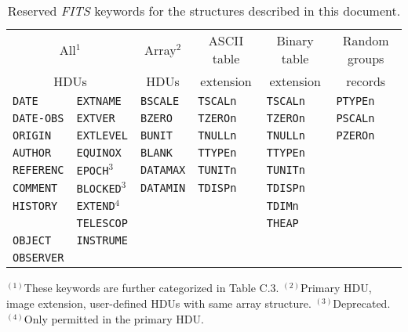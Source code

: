 \documentclass[onecolumn]{aa}
\begin{document}

\begin{table}[hbp]   
\begin{center}
\caption[Reserved {\em FITS\/} keywords.]
         {Reserved {\em FITS\/} keywords for the 
          structures described in this document.}
\label{ta:reservedkeys}
\begin{tabular}{llllll} 
\hline \hline
\multicolumn{2}{c}{All$^{1}$}       & \multicolumn{1}{c}{Array$^{2}$} & 
\multicolumn{1}{c}{ASCII table} & 
\multicolumn{1}{c}{Binary table}& \multicolumn{1}{c}{Random groups}
\\ 
\multicolumn{2}{c}{HDUs}      &\multicolumn{1}{c}{HDUs}        & 
\multicolumn{1}{c}{extension}   & 
\multicolumn{1}{c}{extension}    & \multicolumn{1}{c}{records}     \\
\hline
{\tt DATE}     & {\tt EXTNAME}       & {\tt BSCALE}  & {\tt TSCALn}  & {\tt TSCALn}   & {\tt PTYPEn}  \\ 
{\tt DATE-OBS} & {\tt EXTVER}       & {\tt BZERO}   & {\tt TZEROn}  & {\tt TZEROn}   & {\tt PSCALn}  \\
{\tt ORIGIN}   & {\tt EXTLEVEL}      & {\tt BUNIT}   & {\tt TNULLn}  & {\tt TNULLn}   & {\tt PZEROn}  \\
{\tt AUTHOR}   & {\tt EQUINOX}       & {\tt BLANK}   & {\tt TTYPEn}  & {\tt TTYPEn}   &               \\
{\tt REFERENC} & {\tt EPOCH}$^{3}$   & {\tt DATAMAX} & {\tt TUNITn}  & {\tt TUNITn}   &               \\
{\tt COMMENT}  & {\tt BLOCKED}$^{3}$ & {\tt DATAMIN} & {\tt TDISPn}  & {\tt TDISPn}   &               \\ 
{\tt HISTORY}  & {\tt EXTEND}$^{4}$  &               &               & {\tt TDIMn}    &               \\    
\verb*+        + &  {\tt TELESCOP}   &               &               & {\tt THEAP}    &               \\       
{\tt OBJECT}   & {\tt INSTRUME}      &               &               &                &               \\  
{\tt OBSERVER} &                     &               &               &                &               \\       
  \hline
\end{tabular}
\end{center}
$^{(1)}$These keywords are further categorized in Table C.3. 
$^{(2)}$Primary HDU, image extension, user-defined HDUs with same array
     structure. 
$^{(3)}$Deprecated. 
$^{(4)}$Only permitted in the primary HDU.


\end{table}
\end{document}
